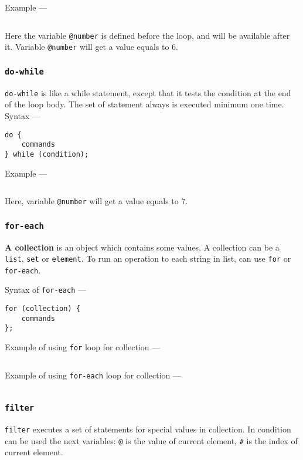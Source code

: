 \newpage
Example —
\inputminted[linenos]{icl}{../sources/whileex.icL}

Here the variable \texttt{@number} is defined before the loop, and will be available after it. Variable \texttt{@number} will get a value equals to 6.

\subsubsection{\texttt{do-while}}

\texttt{do-while} is like a while statement, except that it tests the condition at the end of the loop body. The set of statement always is executed minimum one time.
Syntax —
\begin{verbatim}
do {
	commands
} while (condition);
\end{verbatim}

Example —
\inputminted[linenos]{icl}{../sources/dowhileex.icL}

Here, variable \texttt{@number} will get a value equals to 7.

\subsubsection{\texttt{for-each}}

{\bf A collection} is an object which contains some values. A collection can be a \texttt{list}, \texttt{set} or \texttt{element}. To run an operation to each string in list, can use \texttt{for} or \texttt{for-each}.

Syntax of \texttt{for-each} —
\begin{verbatim}
for (collection) {
	commands
};
\end{verbatim}

\newpage
Example of using \texttt{for} loop for collection —
\inputminted[linenos]{icl}{../sources/colluniloop.icL}

Example of using \texttt{for-each} loop for collection —
\inputminted[linenos]{icl}{../sources/collsimple.icL}

\subsubsection{\texttt{filter}}

\texttt{filter} executes a set of statements for special values in collection. In condition can be used the next variables: \texttt{@} is the value of current element, \texttt{#} is the index of current element.


